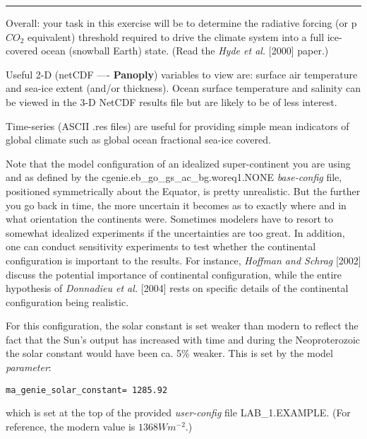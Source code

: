 \documentclass[11pt,fleqn]{book} %
\begin{document}
\vspace{-1mm}
\noindent\rule{4cm}{0.5pt}
\vspace{2mm}

\noindent Overall: your task in this exercise will be to determine the radiative forcing (or p\(CO_{2}\) equivalent) threshold required to drive the climate system into a full ice-covered ocean (snowball Earth) state. (Read the \textit{Hyde et al.} [2000] paper.)

Useful 2-D (netCDF —- \textbf{Panoply}) variables to view are: surface air temperature and sea-ice extent (and/or thickness). Ocean surface temperature and salinity can be viewed in the 3-D NetCDF results file but are likely to be of less interest.

Time-series (ASCII \textsf{\footnotesize .res} files) are useful for providing simple mean indicators of global climate such as global ocean fractional sea-ice covered.

Note that the model configuration of an idealized super-continent you are using and as defined by the \textsf{\footnotesize cgenie.eb\_go\_gs\_ac\_bg.woreq1.NONE} \textit{base-config} file, positioned symmetrically about the Equator, is pretty unrealistic. But the further you go back in time, the more uncertain it becomes as to exactly where and in what orientation the continents were. Sometimes modelers have to resort to somewhat idealized experiments if the uncertainties are too great. In addition, one can conduct sensitivity experiments to test whether the continental configuration is important to the results. For instance, \textit{Hoffman and Schrag} [2002] discuss the potential importance of continental configuration, while the entire hypothesis of \textit{Donnadieu et al.} [2004] rests on specific details of the continental configuration being realistic.

For this configuration, the solar constant is set weaker than modern to reflect the fact that the Sun’s output has increased with time and during the Neoproterozoic the solar constant would have been ca. 5\% weaker. This is set by the model \textit{parameter}:

\vspace{-1mm}
\begin{verbatim}
ma_genie_solar_constant= 1285.92
\end{verbatim}
\vspace{-1mm}

\noindent which is set at the top of the provided \textit{user-config} file  \textsf{\footnotesize LAB\_1.EXAMPLE}. (For reference, the modern value is \( 1368 Wm^{-2}\).)
\end{document}
